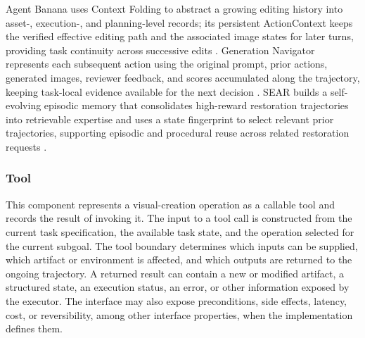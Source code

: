 Agent Banana uses Context Folding to abstract a growing editing history into asset-, execution-, and planning-level records; its persistent ActionContext keeps the verified effective editing path and the associated image states for later turns, providing task continuity across successive edits \cite{ye2026agentbanana}. Generation Navigator represents each subsequent action using the original prompt, prior actions, generated images, reviewer feedback, and scores accumulated along the trajectory, keeping task-local evidence available for the next decision \cite{avg260517969}. SEAR builds a self-evolving episodic memory that consolidates high-reward restoration trajectories into retrievable expertise and uses a state fingerprint to select relevant prior trajectories, supporting episodic and procedural reuse across related restoration requests \cite{avg260628971}.



\subsubsection{Tool}

This component represents a visual-creation operation as a callable tool and records the result of invoking it. The input to a tool call is constructed from the current task specification, the available task state, and the operation selected for the current subgoal. The tool boundary determines which inputs can be supplied, which artifact or environment is affected, and which outputs are returned to the ongoing trajectory. A returned result can contain a new or modified artifact, a structured state, an execution status, an error, or other information exposed by the executor. The interface may also expose preconditions, side effects, latency, cost, or reversibility, among other interface properties, when the implementation defines them.

